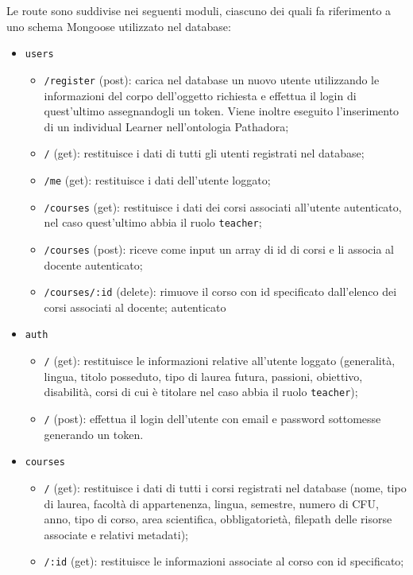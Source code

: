 Le route sono suddivise nei seguenti moduli, ciascuno dei quali fa riferimento a uno schema Mongoose utilizzato nel database:
\begin{itemize}
	\item \texttt{users}
	\begin{itemize}
		\item \texttt{/register} (post): carica nel database un nuovo utente utilizzando le informazioni del corpo dell'oggetto richiesta e effettua il login di quest'ultimo assegnandogli un token. Viene inoltre eseguito l'inserimento di un individual Learner nell'ontologia Pathadora;
		\item \texttt{/} (get): restituisce i dati di tutti gli utenti registrati nel database;
		\item \texttt{/me} (get): restituisce i dati dell'utente loggato;
		\item \texttt{/courses} (get): restituisce i dati dei corsi associati all'utente autenticato, nel caso quest'ultimo abbia il ruolo \texttt{teacher};
		\item \texttt{/courses} (post): riceve come input un array di id di corsi e li associa al docente autenticato;
		\item \texttt{/courses/:id} (delete): rimuove il corso con id specificato dall'elenco dei corsi associati al docente; autenticato
	\end{itemize}
	\item \texttt{auth}
	\begin{itemize}
		\item \texttt{/} (get): restituisce le informazioni relative all'utente loggato (generalità, lingua, titolo posseduto, tipo di laurea futura, passioni, obiettivo, disabilità, corsi di cui è titolare nel caso abbia il ruolo \texttt{teacher});
		\item \texttt{/} (post): effettua il login dell'utente con email e password sottomesse generando un token.
	\end{itemize}
	\item \texttt{courses}
	\begin{itemize}
		\item \texttt{/} (get): restituisce i dati di tutti i corsi registrati nel database (nome, tipo di laurea, facoltà di appartenenza, lingua, semestre, numero di CFU, anno, tipo di corso, area scientifica, obbligatorietà, filepath delle risorse associate e relativi metadati);
		\item \texttt{/:id} (get): restituisce le informazioni associate al corso con id specificato;

\end{itemize}
\end{itemize}
